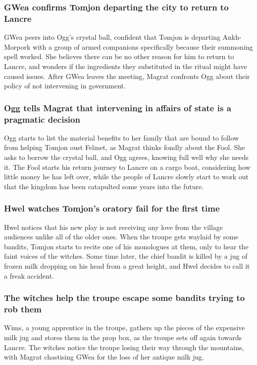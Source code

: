 \subsubsection{\Gls{GWea} confirms \Gls{Tomjon} departing the city to return to Lancre}
\Gls{GWea} peers into \Gls{Ogg}'s crystal ball, confident that \Gls{Tomjon} is departing
Ankh-Morpork with a group of armed companions specifically because their summoning spell worked. She
believes there can be no other reason for him to return to Lancre, and wonders if the ingredients
they substituted in the ritual might have caused issues. After \Gls{GWea} leaves the meeting,
\Gls{Magrat} confronts \Gls{Ogg} about their policy of not intervening in government.

\subsubsection{\Gls{Ogg} tells \Gls{Magrat} that intervening in affairs of state is a pragmatic
    decision}
\Gls{Ogg} starts to list the material benefits to her family that are bound to follow from helping
\Gls{Tomjon} oust \Gls{Felmet}, as \Gls{Magrat} thinks fondly about the \Gls{Fool}. She asks to
borrow the crystal ball, and \Gls{Ogg} agrees, knowing full well why she needs it. The \Gls{Fool}
starts his return journey to Lancre on a cargo boat, considering how little money he has left over,
while the people of Lancre slowly start to work out that the kingdom has been catapulted some years
into the future.

\subsubsection{\Gls{Hwel} watches \Gls{Tomjon}'s oratory fail for the first time}
\Gls{Hwel} notices that his new play is not receiving any love from the village audiences unlike all
of the older ones. When the troupe gets waylaid by some bandits, \Gls{Tomjon} starts to recite one
of his monologues at them, only to hear the faint voices of the witches. Some time later, the
chief bandit is killed by a jug of frozen milk dropping on his head from a great height, and
\Gls{Hwel} decides to call it a freak accident.

\subsubsection{The witches help the troupe escape some bandits trying to rob them}
\Gls{Wims}, a young apprentice in the troupe, gathers up the pieces of the expensive milk jug and
stores them in the prop box, as the troupe sets off again towards Lancre. The witches notice the
troupe losing their way through the mountains, with \Gls{Magrat} chastising \Gls{GWea} for the loss
of her antique milk jug.

